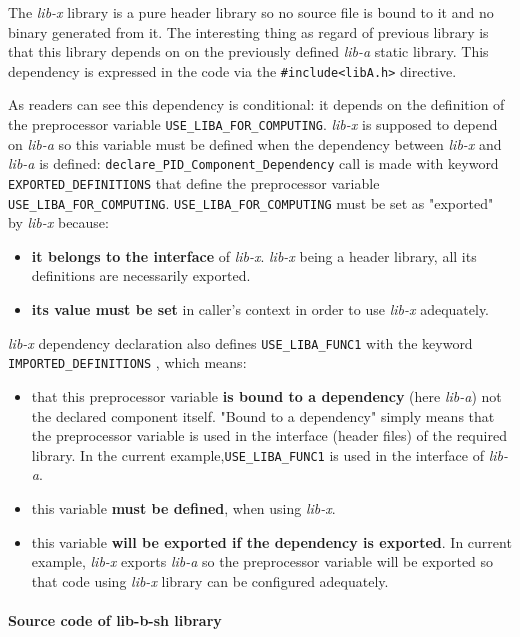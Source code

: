 \documentclass[12pt,a4paper]{article}
\begin{document}
The \textit{lib-x} library is a pure header library so no source file is bound to it and no binary generated from it. The interesting thing as regard of previous library is that this library depends on on the previously defined \textit{lib-a} static library. This dependency is expressed in the code via the \texttt{\#include<libA.h>} directive.

As readers can see this dependency is conditional: it depends on the definition of the preprocessor variable \texttt{USE\_LIBA\_FOR\_COMPUTING}. \textit{lib-x} is supposed to depend on \textit{lib-a} so this variable must be defined when the dependency between \textit{lib-x} and \textit{lib-a} is defined: \texttt{declare\_PID\_Component\_Dependency} call is made with keyword \texttt{EXPORTED\_DEFINITIONS} that define the preprocessor variable \texttt{USE\_LIBA\_FOR\_COMPUTING}. \texttt{USE\_LIBA\_FOR\_COMPUTING} must be set as "exported" by \textit{lib-x} because:
\begin{itemize}
\item \textbf{it belongs to the interface} of \textit{lib-x}. \textit{lib-x} being a header library, all its definitions are necessarily exported.
\item \textbf{its value must be set} in caller's context in order to use \textit{lib-x} adequately.
\end{itemize}

\textit{lib-x} dependency declaration also defines \texttt{USE\_LIBA\_FUNC1} with the keyword \texttt{IMPORTED\_DEFINITIONS} , which means:
\begin{itemize}
\item that this preprocessor variable \textbf{is bound to a dependency} (here \textit{lib-a}) not the declared component itself. "Bound to a dependency" simply means that the preprocessor variable is used in the interface (header files) of the required library. In the current example,\texttt{USE\_LIBA\_FUNC1} is used in the interface of \textit{lib-a}. 
\item this variable \textbf{must be defined}, when using \textit{lib-x}.
\item this variable \textbf{will be exported if the dependency is exported}. In current example, \textit{lib-x} exports \textit{lib-a} so the preprocessor variable will be exported so that code using \textit{lib-x} library can be configured adequately.
\end{itemize}

\paragraph{Source code of lib-b-sh library}
\end{document}
